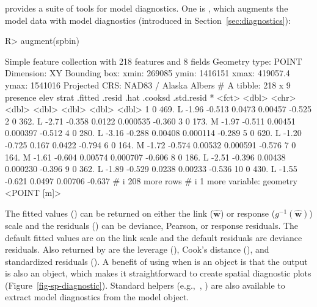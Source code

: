 \documentclass[
]{jss}
\begin{document}
 provides a suite of tools for model diagnostics. One is
, which augments the model data with model diagnostics
(introduced in Section~\ref{sec:diagnostics}):

\begin{CodeChunk}
\begin{CodeInput}
R> augment(spbin)
\end{CodeInput}
\begin{CodeOutput}
Simple feature collection with 218 features and 8 fields
Geometry type: POINT
Dimension:     XY
Bounding box:  xmin: 269085 ymin: 1416151 xmax: 419057.4 ymax: 1541016
Projected CRS: NAD83 / Alaska Albers
# A tibble: 218 x 9
   presence  elev strat .fitted .resid    .hat  .cooksd .std.resid
 * <fct>    <dbl> <chr>   <dbl>  <dbl>   <dbl>    <dbl>      <dbl>
 1 0         469. L       -1.96 -0.513 0.0473  0.00457      -0.525
 2 0         362. L       -2.71 -0.358 0.0122  0.000535     -0.360
 3 0         173. M       -1.97 -0.511 0.00451 0.000397     -0.512
 4 0         280. L       -3.16 -0.288 0.00408 0.000114     -0.289
 5 0         620. L       -1.20 -0.725 0.167   0.0422       -0.794
 6 0         164. M       -1.72 -0.574 0.00532 0.000591     -0.576
 7 0         164. M       -1.61 -0.604 0.00574 0.000707     -0.606
 8 0         186. L       -2.51 -0.396 0.00438 0.000230     -0.396
 9 0         362. L       -1.89 -0.529 0.0238  0.00233      -0.536
10 0         430. L       -1.55 -0.621 0.0497  0.00706      -0.637
# i 208 more rows
# i 1 more variable: geometry <POINT [m]>
\end{CodeOutput}
\end{CodeChunk}

The fitted values () can be returned on either the link
(\(\hat{\mathbf{w}}\)) or response (\(g^{-1}(\hat{\mathbf{w}})\)) scale
and the residuals () can be deviance, Pearson, or response
residuals. The default fitted values are on the link scale and the
default residuals are deviance residuals. Also returned by
 are the leverage (), Cook's distance
(), and standardized residuals (). A
benefit of using  when  is an 
object is that the output is also an  object, which makes it
straightforward to create spatial diagnostic plots
(Figure~\ref{fig-sp-diagnostic}). Standard  helpers
(e.g.,~, ) are also available to
extract model diagnostics from the model object.
\end{document}
